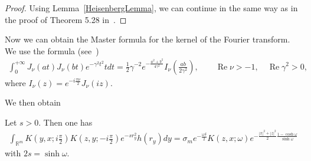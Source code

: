 \documentclass[pdftex]{sigma}
\numberwithin{equation}{section}
\numberwithin{theorem}{section}
\numberwithin{proposition}{section}
\numberwithin{lemma}{section}
\numberwithin{corollary}{section}
\numberwithin{definition}{section}
\numberwithin{example}{section}
\numberwithin{remark}{section}
\numberwithin{note}{section}
\theoremstyle{remark}
\newcommand{\mR}{\mathbb{R}}
\newcommand{\ux}{\underline{x}}
\newcommand{\uz}{\underline{z}}
\def\d{{\delta}}
\def\o{{\omega}}
\def\s{{\sigma}}
\begin{document}
\begin{proof}
Using Lemma~\ref{HeisenbergLemma}, we can continue in the same way as in the proof of Theorem 5.28
in~\cite{Orsted2}.
\end{proof}

Now we can obtain the Master formula for the kernel of the Fourier transform.
We use the formula (see~\cite[p.~50]{MR0698780})
\begin{gather}
\label{besselint1}
\int_{0}^{+\infty}J_{\nu}(a t)J_{\nu}(b t)e^{-\gamma^{2}t^{2}}t dt=\frac{1}{2}\gamma^{-2}
e^{-\frac{a^{2}+b^{2}}{4\gamma^{2}}}I_{\nu}\left(\frac{a b}{2\gamma^{2}}\right),\qquad
\operatorname{Re}\nu>-1,\quad\operatorname{Re}\gamma^{2}>0,
\end{gather}
where $I_{\nu}(z)=e^{-i\frac{\pi\nu}{2}}J_{\nu}(i z)$.

We then obtain

\begin{theorem}\label{MasterFormula}
Let $s>0$.
Then one has
\begin{gather*}
\int_{\mR^{m}}K\left(y,x;i\frac{\pi}{2}\right)K\left(z,y;-i\frac{\pi}{2}\right)e^{-s r_{y}^{2}}h(r_{y})dy=\s_{m}
e^{-\frac{\o\d}{2}}K(z,x;\o)e^{-\frac{|\ux|^{2}+|\uz|^{2}}{2}\frac{1-\cosh{\o}}{\sinh{\o}}}
\end{gather*}
with $2s=\sinh{\o}$.
\end{theorem}
\end{document}
